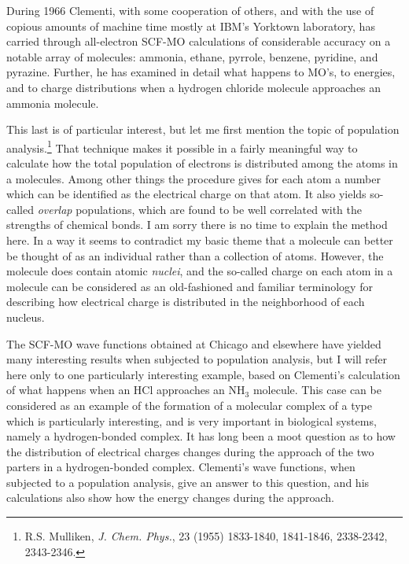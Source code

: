 \documentclass[11pt]{memoir}
\begin{document}
During 1966 Clementi, with some cooperation of others, and with the use of copious amounts of machine time mostly at IBM's Yorktown laboratory, has carried through all-electron SCF-MO calculations of considerable accuracy on a notable array of molecules: ammonia, ethane, pyrrole, benzene, pyridine, and pyrazine.  Further, he has examined in detail what happens to MO's, to energies, and to charge distributions when a hydrogen chloride molecule approaches an ammonia molecule.

This last is of particular interest, but let me first mention the topic of population analysis.\footnote{R.S. Mulliken, \emph{J. Chem. Phys.}, 23 (1955) 1833-1840, 1841-1846, 2338-2342, 2343-2346.}  That technique makes it possible in a fairly meaningful way to calculate how the total population of electrons is distributed among the atoms in a molecules.  Among other things the procedure gives for each atom a number which can be identified as the electrical charge on that atom.  It also yields so-called \emph{overlap} populations, which are found to be well correlated with the strengths of chemical bonds.  I am sorry there is no time to explain the method here.  In a way it seems to contradict my basic theme that a molecule can better be thought of as an individual rather than a collection of atoms.  However, the molecule does contain atomic \emph{nuclei}, and the so-called charge on each atom in a molecule can be considered as an old-fashioned and familiar terminology for describing how electrical charge is distributed in the neighborhood of each nucleus.

The SCF-MO wave functions obtained at Chicago and elsewhere have yielded many interesting results when subjected to population analysis, but I will refer here only to one particularly interesting example, based on Clementi's calculation of what happens when an HCl approaches an $\mathrm{NH_3}$ molecule.  This case can be considered as an example of the formation of a molecular complex of a type which is particularly interesting, and is very important in biological systems, namely a hydrogen-bonded complex.  It has long been a moot question as to how the distribution of electrical charges changes during the approach of the two parters in a hydrogen-bonded complex.  Clementi's wave functions, when subjected to a population analysis, give an answer to this question, and his calculations also show how the energy changes during the approach.
\end{document}

